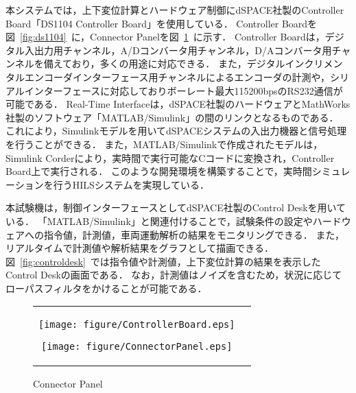 \documentclass[a4paper,12pt]{article_vdlab_sotsuron}
\begin{document}
本システムでは，上下変位計算とハードウェア制御にdSPACE社製のController Board「DS1104 Controller Board」を使用している．
Controller Boardを図~\ref{fig:ds1104}~に，Connector Panelを図~\ref{fig:conpane}~に示す．
Controller Boardは，デジタル入出力用チャンネル，A/Dコンバータ用チャンネル，D/Aコンバータ用チャンネルを備えており，多くの用途に対応できる．
また，デジタルインクリメンタルエンコーダインターフェース用チャンネルによるエンコーダの計測や，シリアルインターフェースに対応しておりボーレート最大115200bpsのRS232通信が可能である．
Real-Time Interfaceは，dSPACE社製のハードウェアとMathWorks社製のソフトウェア「MATLAB/Simulink」の間のリンクとなるものである．
これにより，Simulinkモデルを用いてdSPACEシステムの入出力機器と信号処理を行うことができる．
また，MATLAB/Simulinkで作成されたモデルは，Simulink Corderにより，実時間で実行可能なCコードに変換され，Controller Board上で実行される．
このような開発環境を構築することで，実時間シミュレーションを行うHILSシステムを実現している．

\par
本試験機は，制御インターフェースとしてdSPACE社製のControl Deskを用いている．
「MATLAB/Simulink」と関連付けることで，試験条件の設定やハードウェアへの指令値，計測値，車両運動解析の結果をモニタリングできる．
また，リアルタイムで計測値や解析結果をグラフとして描画できる．図~\ref{fig:controldesk}~では指令値や計測値，上下変位計算の結果を表示したControl Deskの画面である．
なお，計測値はノイズを含むため，状況に応じてローパスフィルタをかけることが可能である．

\vspace{12mm}
\begin{figure}[h]
    \begin{tabular}{cc}
      \begin{minipage}{0.5\hsize}
	\begin{center}
	  \texttt{[image: figure/ControllerBoard.eps]}
	  \caption{Controller Borad~\cite{dspace}}
	  \label{fig:ds1104}
	\end{center}
      \end{minipage}

      \begin{minipage}{0.4\hsize}
	\begin{center}
	  \texttt{[image: figure/ConnectorPanel.eps]}
	  \caption{Connector Panel~\cite{dspace}}
	  \label{fig:conpane}
	\end{center}
      \end{minipage}
    \end{tabular}
\end{figure}
\end{document}
